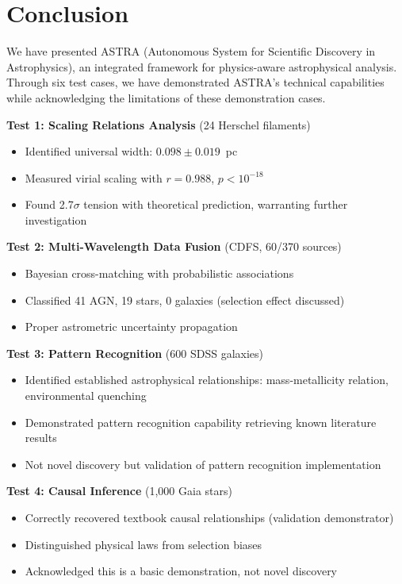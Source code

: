 \documentclass[usenatbib]{rasti}
\begin{document}
\section{Conclusion}

We have presented ASTRA (Autonomous System for Scientific Discovery in Astrophysics), an integrated framework for physics-aware astrophysical analysis. Through six test cases, we have demonstrated ASTRA's technical capabilities while acknowledging the limitations of these demonstration cases.

\textbf{Test 1: Scaling Relations Analysis} (24 Herschel filaments)
\begin{itemize}
\item Identified universal width: $0.098 \pm 0.019$~pc
\item Measured virial scaling with $r = 0.988$, $p < 10^{-18}$
\item Found 2.7$\sigma$ tension with theoretical prediction, warranting further investigation
\end{itemize}

\textbf{Test 2: Multi-Wavelength Data Fusion} (CDFS, 60/370 sources)
\begin{itemize}
\item Bayesian cross-matching with probabilistic associations
\item Classified 41 AGN, 19 stars, 0 galaxies (selection effect discussed)
\item Proper astrometric uncertainty propagation
\end{itemize}

\textbf{Test 3: Pattern Recognition} (600 SDSS galaxies)
\begin{itemize}
\item Identified established astrophysical relationships: mass-metallicity relation, environmental quenching
\item Demonstrated pattern recognition capability retrieving known literature results
\item Not novel discovery but validation of pattern recognition implementation
\end{itemize}

\textbf{Test 4: Causal Inference} (1,000 Gaia stars)
\begin{itemize}
\item Correctly recovered textbook causal relationships (validation demonstrator)
\item Distinguished physical laws from selection biases
\item Acknowledged this is a basic demonstration, not novel discovery
\end{itemize}
\end{document}
